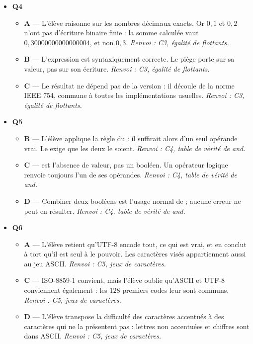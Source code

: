 \begin{itemize}
  \item \textbf{Q4}
  \begin{itemize}
    \item \textbf{A} — L'élève raisonne sur les nombres décimaux exacts. Or $0{,}1$ et $0{,}2$ n'ont pas d'écriture binaire finie : la somme calculée vaut $0{,}30000000000000004$, et non $0{,}3$. \emph{Renvoi : C3, égalité de flottants.}
    \item \textbf{B} — L'expression est syntaxiquement correcte. Le piège porte sur sa valeur, pas sur son écriture. \emph{Renvoi : C3, égalité de flottants.}
    \item \textbf{C} — Le résultat ne dépend pas de la version : il découle de la norme IEEE 754, commune à toutes les implémentations usuelles. \emph{Renvoi : C3, égalité de flottants.}
  \end{itemize}
  \item \textbf{Q5}
  \begin{itemize}
    \item \textbf{B} — L'élève applique la règle du  : il suffirait alors d'un seul opérande vrai. Le  exige que les deux le soient. \emph{Renvoi : C4, table de vérité de and.}
    \item \textbf{C} —  est l'absence de valeur, pas un booléen. Un opérateur logique renvoie toujours l'un de ses opérandes. \emph{Renvoi : C4, table de vérité de and.}
    \item \textbf{D} — Combiner deux booléens est l'usage normal de  ; aucune erreur ne peut en résulter. \emph{Renvoi : C4, table de vérité de and.}
  \end{itemize}
  \item \textbf{Q6}
  \begin{itemize}
    \item \textbf{A} — L'élève retient qu'UTF-8 encode tout, ce qui est vrai, et en conclut à tort qu'il est seul à le pouvoir. Les caractères visés appartiennent aussi au jeu ASCII. \emph{Renvoi : C5, jeux de caractères.}
    \item \textbf{C} — ISO-8859-1 convient, mais l'élève oublie qu'ASCII et UTF-8 conviennent également : les $128$ premiers codes leur sont communs. \emph{Renvoi : C5, jeux de caractères.}
    \item \textbf{D} — L'élève transpose la difficulté des caractères accentués à des caractères qui ne la présentent pas : lettres non accentuées et chiffres sont dans ASCII. \emph{Renvoi : C5, jeux de caractères.}
  \end{itemize}
\end{itemize}
\fi
